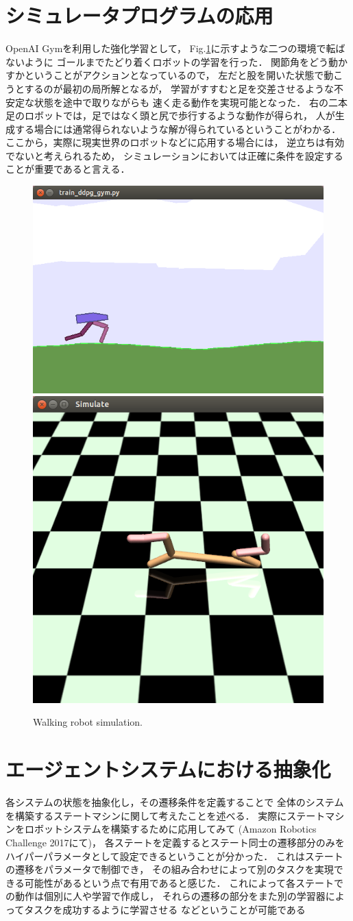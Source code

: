 \documentclass[letterpaper, 12 pt, conference, onecolumn]{ieeeconf}  %
\newcommand{\figref}[1]{Fig.\ref{figure:#1}}
\begin{document}
\newpage

\section{シミュレータプログラムの応用}

OpenAI Gymを利用した強化学習として，
\figref{a}に示すような二つの環境で転ばないように
ゴールまでたどり着くロボットの学習を行った．
関節角をどう動かすかということがアクションとなっているので，
左だと股を開いた状態で動こうとするのが最初の局所解となるが，
学習がすすむと足を交差させるような不安定な状態を途中で取りながらも
速く走る動作を実現可能となった．
右の二本足のロボットでは，足ではなく頭と尻で歩行するような動作が得られ，
人が生成する場合には通常得られないような解が得られているということがわかる．
ここから，実際に現実世界のロボットなどに応用する場合には，
逆立ちは有効でないと考えられるため，
シミュレーションにおいては正確に条件を設定することが重要であると言える．

\begin{figure}[htbp]
  \centering
  \includegraphics[width=0.5\columnwidth]{figs/a}
  \includegraphics[width=0.34\columnwidth]{figs/b}
  \caption{Walking robot simulation.}
  \label{figure:a}
\end{figure}

\section{エージェントシステムにおける抽象化}

各システムの状態を抽象化し，その遷移条件を定義することで
全体のシステムを構築するステートマシンに関して考えたことを述べる．
実際にステートマシンをロボットシステムを構築するために応用してみて
(Amazon Robotics Challenge 2017にて)，
各ステートを定義するとステート同士の遷移部分のみを
ハイパーパラメータとして設定できるということが分かった．
これはステートの遷移をパラメータで制御でき，
その組み合わせによって別のタスクを実現できる可能性があるという点で有用であると感じた．
これによって各ステートでの動作は個別に人や学習で作成し，
それらの遷移の部分をまた別の学習器によってタスクを成功するように学習させる
などということが可能である
\end{document}
